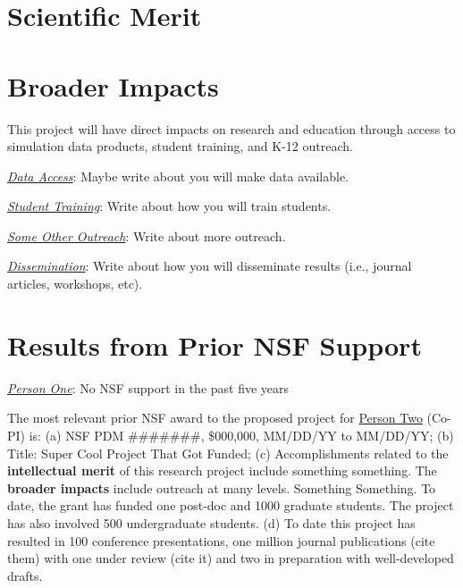 \section{Scientific Merit}



\section{Broader Impacts}
\label{broadimpacts}
\vspace*{-8pt}

This project will have direct impacts on research and education through access to simulation data products, student training, and K-12 outreach.

\vspace{4pt}
\noindent \underline{\textit{Data Access}}: Maybe write about you will make data available.

\vspace{4pt}
\noindent \underline{\textit{Student Training}}: Write about how you will train students.

\vspace{4pt}
\noindent \underline{\textit{Some Other Outreach}}: Write about more outreach.

\vspace{4pt}
\noindent \underline{\textit{Dissemination}}: Write about how you will disseminate results (i.e., journal articles, workshops, etc).

\section{Results from Prior NSF Support}

\noindent \emph{\underline{Person One}}: No NSF support in the past five years \newline

\noindent The most relevant prior NSF award to the proposed project for
\underline{Person Two} (Co-PI) is: (a) NSF PDM \#\#\#\#\#\#\#, \$000,000,
MM/DD/YY to MM/DD/YY; (b) Title: Super Cool Project That Got Funded; (c)
Accomplishments related to the \textbf{intellectual merit} of this research project
include something something. The \textbf{broader impacts} include outreach at many
levels. Something Something. To date, the grant has funded one post-doc and 1000
graduate students. The project has also involved 500 undergraduate students. (d)
To date this project has resulted in 100 conference presentations, one million
journal publications (cite them) with one under review (cite it) and two in
preparation with well-developed drafts.

